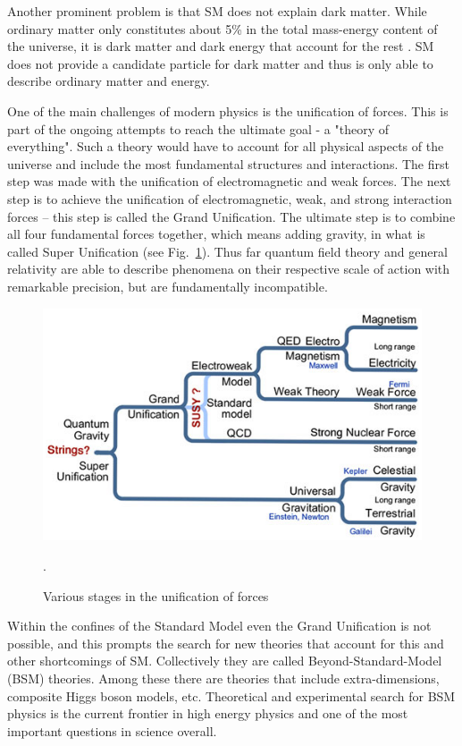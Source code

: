 Another prominent problem is that SM does not explain dark matter. While ordinary matter only constitutes about 5\% in the total mass-energy content of the universe, it is dark matter and dark energy that account for the rest \citep{ade2014planck}. 
SM does not provide a candidate particle for dark matter and thus is only able to describe ordinary matter and energy. 

One of the main challenges of modern physics is the unification of forces. This is part of the ongoing attempts to reach the ultimate goal - a "theory of everything". Such a theory would have to account for all physical aspects of the universe and include the most fundamental structures and interactions. The first step was made with the unification of electromagnetic and weak forces.  
The next step is to achieve the unification of electromagnetic, weak, and strong interaction forces – this step is called the Grand Unification. The ultimate step is to combine all four fundamental forces together, which means adding gravity, in what is called Super Unification (see Fig.~\ref{fig:unification}). Thus far quantum field theory and general relativity are able to describe phenomena on their respective scale of action with remarkable precision, but are fundamentally incompatible.  
\begin{figure}[ht]
		\centering
			\includegraphics[scale=0.8]{Chap2/Unification}
\caption{\label{fig:unification} Various stages in the unification of forces  \citep{unification}}.
\end{figure}

Within the confines of the Standard Model even the Grand Unification is not possible, and this prompts the search for new theories that account for this and other shortcomings of SM. Collectively they are called Beyond-Standard-Model (BSM) theories. Among these there are theories that include extra-dimensions, composite Higgs boson models, etc. Theoretical and experimental search for BSM physics is the current frontier in high energy physics and one of the most important questions in science overall. 


